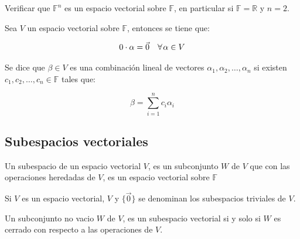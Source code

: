 		\begin{ejemplo}
		\end{ejemplo}

		\begin{ejercicio}
			Verificar que $\mathbb{F}^n$ es un espacio vectorial sobre $\mathbb{F}$, en particular si $\mathbb{F} = \mathbb{R}$ y $n = 2$.
		\end{ejercicio}

		\begin{proposicion}
			Sea $V$ un espacio vectorial sobre $\mathbb{F}$, entonces se tiene que:

			\begin{equation}
				0 \cdot \alpha = \vec{0} \quad \forall \mkern2mu \alpha \in V
			\end{equation}
		\end{proposicion}

		\begin{definicion}
			Se dice que $\beta \in V$ es una combinación lineal de vectores $\alpha_1, \alpha_2, \dots, \alpha_n$ si existen $c_1, c_2, \dots, c_n \in \mathbb{F}$ tales que:

			\begin{equation}
				\beta = \sum_{i=1}^n c_i \alpha_i
			\end{equation}
		\end{definicion}

	\newpage
	\subsection{Subespacios vectoriales}

		\begin{definicion}
			Un subespacio de un espacio vectorial $V$, es un subconjunto $W$ de $V$ que con las operaciones heredadas de $V$, es un espacio vectorial sobre $\mathbb{F}$ 
		\end{definicion}

		\begin{observacion}
			Si $V$ es un espacio vectorial, $V$ y $\{\vec{0}\}$ se denominan los subespacios triviales de $V$.
		\end{observacion}

		\begin{proposicion}
			Un subconjunto no vacio $W$ de $V$, es un subespacio vectorial si y solo si $W$ es cerrado con respecto a las operaciones de $V$.
		\end{proposicion}

